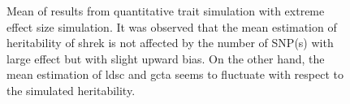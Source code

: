 \begin{figure}
{				
				\label{fig:ldscInQtEx100cMean}
			}
			\caption[Mean of Extreme Effect Size Simulation Result]
			{Mean of results from quantitative trait simulation with extreme effect size simulation.
				It was observed that the mean estimation of heritability of \gls{shrek} is not affected by the number of \gls{SNP}(s) with large effect but with slight upward bias.
				On the other hand, the mean estimation of \gls{ldsc} and \gls{gcta} seems to fluctuate with respect to the simulated heritability.
				} 
			\label{fig:QtEx100cMean}
		\end{figure}
		
